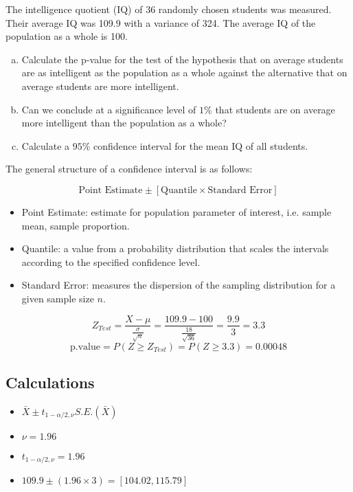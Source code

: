 \documentclass[a4paper,12pt]{article}
\begin{document}
	

\large
\noindent The intelligence quotient (IQ) of 36 randomly chosen students was measured.
Their average IQ was 109.9 with a variance of 324.
The average IQ of the population as a whole is 100.
\begin{enumerate}[(a)]
\item Calculate the p-value for the test of the hypothesis that on average
students are as intelligent as the population as a whole against the alternative that on average students are more intelligent.
\item Can we conclude at a significance level of $1\%$ that students are on average more intelligent than the population as a whole?
\item Calculate a $95\%$ confidence interval for the mean IQ of all students.
\end{enumerate}
\medskip 


\begin{framed}
The general structure of a confidence interval is as follows:

\[ \mbox{Point Estimate}  \pm \left[ \mbox{Quantile} \times \mbox{Standard Error} \right] \]


\begin{itemize}
\item Point Estimate: estimate for population parameter of interest, i.e. sample mean, sample proportion.
\item Quantile: a value from a probability distribution that scales the intervals according to the specified confidence level.
\item Standard Error: measures the dispersion of the sampling distribution for a given sample size $n$.
\end{itemize}
\end{framed}
\[Z_{Test} = \frac{X- \mu}{\frac{\sigma}{\sqrt{n}}} = \frac{109.9 - 100}{\frac{18}{\sqrt{36}}} = \frac{9.9}{3} = 3.3\]
\[\mbox{p.value} = P(Z \geq Z_{Test}) = P(Z \geq 3.3) = 0.00048\]


\subsection*{Calculations}
\begin{itemize}
\item $\bar{X} \pm t_{1-\alpha/2,\nu}S.E.(\bar{X})$
\item $\nu = 1.96$
\item $t_{1-\alpha/2,\nu} = 1.96$
\item $109.9 \pm (1.96 \times 3) = [104.02, 115.79]$
\end{itemize}
\end{document}

